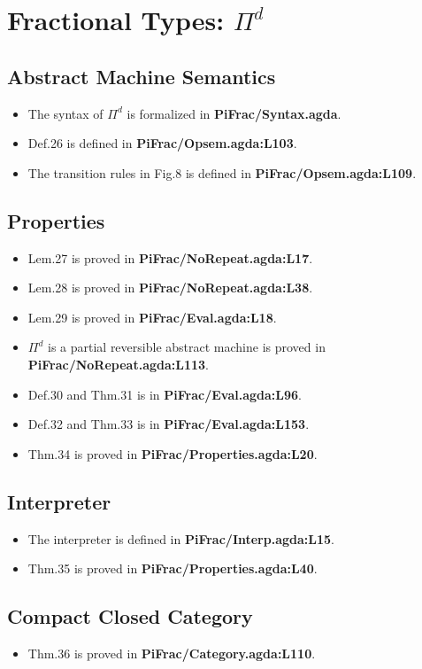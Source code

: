 \documentclass{article}
\begin{document}
\section{Fractional Types: $\Pi^d$}
\subsection{Abstract Machine Semantics}
\begin{itemize}
\item The syntax of $\Pi^d$ is formalized in \textbf{PiFrac/Syntax.agda}.
\item Def.26 is defined in \textbf{PiFrac/Opsem.agda:L103}.
\item The transition rules in Fig.8 is defined in \textbf{PiFrac/Opsem.agda:L109}.
\end{itemize}

\subsection{Properties}
\begin{itemize}
\item Lem.27 is proved in \textbf{PiFrac/NoRepeat.agda:L17}.
\item Lem.28 is proved in \textbf{PiFrac/NoRepeat.agda:L38}.
\item Lem.29 is proved in \textbf{PiFrac/Eval.agda:L18}.
\item $\Pi^d$ is a partial reversible abstract machine is proved in \textbf{PiFrac/NoRepeat.agda:L113}.
\item Def.30 and Thm.31 is in \textbf{PiFrac/Eval.agda:L96}.
\item Def.32 and Thm.33 is in \textbf{PiFrac/Eval.agda:L153}.
\item Thm.34 is proved in \textbf{PiFrac/Properties.agda:L20}.
\end{itemize}

\subsection{Interpreter}
\begin{itemize}
\item The interpreter is defined in \textbf{PiFrac/Interp.agda:L15}.
\item Thm.35 is proved in \textbf{PiFrac/Properties.agda:L40}.
\end{itemize}

\subsection{Compact Closed Category}
\begin{itemize}
\item Thm.36 is proved in \textbf{PiFrac/Category.agda:L110}.
\end{itemize}
\end{document}
